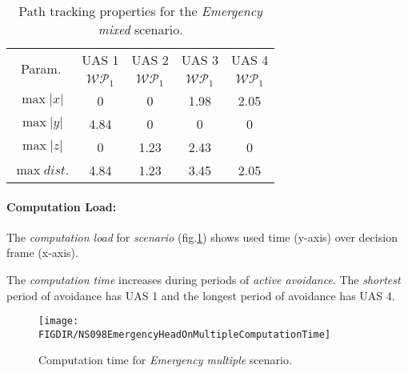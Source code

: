     \begin{table}[H]
        \centering
        \begin{tabular}{c||c|c|c|c}
            \multirow{2}{*}{Param.} & UAS 1     & UAS 2             & UAS 3             & UAS 4 \\\cline{2-5}
                            & $\mathscr{WP}_1$  & $\mathscr{WP}_1$  & $\mathscr{WP}_1$  & $\mathscr{WP}_1$ \\\hline\hline
              $\max |x|$    & 0                 & 0                 & 1.98              & 2.05\\\hline
              $\max |y|$    & 4.84              & 0                 & 0                 & 0\\\hline
              $\max |z|$    & 0                 & 1.23              & 2.43              & 0\\\hline
              $\max dist.$  & 4.84              & 1.23              & 3.45              & 2.05\\
        \end{tabular}
        \caption{Path tracking properties for the \emph{Emergency mixed} scenario.}
        \label{tab:pathTrackingParametersForEmergencyMixed}
    \end{table}    


\paragraph{Computation Load:} The \emph{computation load} for \emph{scenario} (fig.\ref{fig:emergencyHeadOnMultipleComputationTime}) shows used time (y-axis) over decision frame (x-axis).

The \emph{computation time} increases during periods of \emph{active avoidance}. The \emph{shortest} period of avoidance has UAS 1 and the longest period of avoidance has UAS 4.

\begin{figure}[H]
    \centering
    \texttt{[image: \\FIGDIR/NS098EmergencyHeadOnMultipleComputationTime]} 
    \caption{Computation time for \emph{Emergency multiple} scenario.}
    \label{fig:emergencyHeadOnMultipleComputationTime}
\end{figure}


